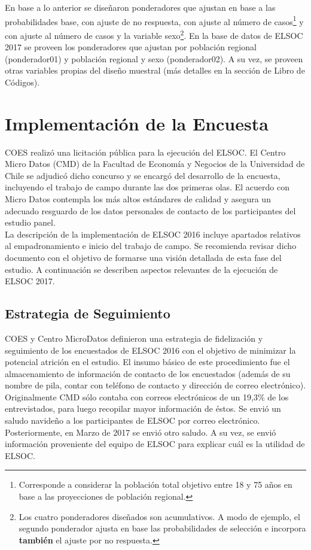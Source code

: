 \documentclass[12pt]{report}
\begin{document}
En base a lo anterior se diseñaron ponderadores que ajustan en base a las probabilidades base, con ajuste de no respuesta, con ajuste al número de casos\footnote{Corresponde a considerar la población total objetivo entre 18 y 75 años en base a las proyecciones de población regional.} y con ajuste al número de casos y la variable sexo\footnote{Los cuatro ponderadores diseñados son acumulativos. A modo de ejemplo, el segundo ponderador ajusta en base  las probabilidades de selección e incorpora \textbf{también} el ajuste por no respuesta.}. En la base de datos de ELSOC 2017 se proveen los ponderadores que ajustan por población regional (ponderador01) y población regional y sexo (ponderador02). A su vez, se proveen otras variables propias del diseño muestral (más detalles en la sección de Libro de Códigos).
	
\newpage
\section*{Implementación de la Encuesta}

COES realizó una licitación pública para la ejecución del ELSOC.  El Centro Micro Datos (CMD) de la Facultad de Economía y Negocios de la Universidad de Chile se adjudicó dicho concurso y se encargó del desarrollo de la encuesta, incluyendo el trabajo de campo durante las dos primeras olas. El acuerdo con Micro Datos contempla los más altos estándares de calidad y asegura un adecuado resguardo de los datos personales de contacto de los participantes del estudio panel.\\

La descripción de la implementación de ELSOC 2016 incluye apartados relativos al empadronamiento e inicio del trabajo de campo. Se recomienda revisar dicho documento con el objetivo de formarse una visión detallada de esta fase del estudio. A continuación se describen aspectos relevantes de la ejecución de ELSOC 2017.\\

\subsection*{Estrategia de Seguimiento}

COES y Centro MicroDatos definieron una estrategia de fidelización y seguimiento de los encuestados de ELSOC 2016 con el objetivo de minimizar la potencial atrición en el estudio. El insumo básico de este procedimiento fue el almacenamiento de información de contacto de los encuestados (además de su nombre de pila, contar con teléfono de contacto y dirección de correo electrónico). Originalmente CMD sólo contaba con correos electrónicos  de un 19,3\% de los entrevistados, para luego recopilar mayor información de éstos. Se envió un saludo navideño a los participantes de ELSOC por correo electrónico. Posteriormente, en Marzo de 2017 se envió otro saludo. A su vez, se envió información proveniente del equipo de ELSOC para explicar cuál es la utilidad de ELSOC.\\
\end{document}
